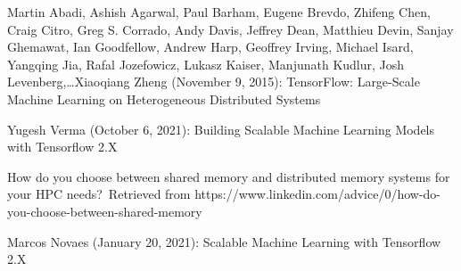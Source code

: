 \documentclass[ieeetran]{article}
\begin{document}
\pagebreak
\begin{thebibliography}{3}

Martin Abadi, Ashish Agarwal, Paul Barham, Eugene Brevdo, Zhifeng Chen, Craig Citro, Greg S. Corrado, Andy Davis, Jeffrey Dean, Matthieu Devin, Sanjay Ghemawat, Ian Goodfellow, Andrew Harp, Geoffrey Irving, Michael Isard, Yangqing Jia, Rafal Jozefowicz, Lukasz Kaiser, Manjunath Kudlur, Josh Levenberg,\ldots Xiaoqiang Zheng (November 9, 2015): TensorFlow: Large-Scale Machine Learning on Heterogeneous Distributed Systems 

Yugesh Verma (October 6, 2021): Building Scalable Machine Learning Models with Tensorflow 2.X

How do you choose between shared memory and distributed memory systems for your HPC needs?\ Retrieved from https://www.linkedin.com/advice/0/how-do-you-choose-between-shared-memory 

Marcos Novaes (January 20, 2021): Scalable Machine Learning with Tensorflow 2.X


\end{thebibliography}
\end{document}
